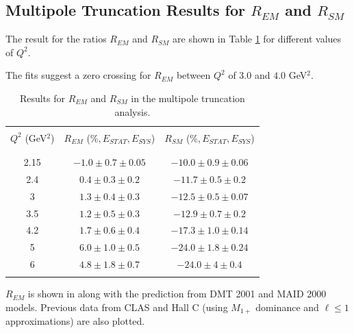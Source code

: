 \cia
\subsection{Multipole Truncation Results for $R_{EM}$ and $R_{SM}$}
The result for the ratios $R_{EM}$ and $R_{SM}$ are shown in Table 
\ref{tab:result_ratio} for different values of $Q^2$.

The fits suggest a zero crossing for $R_{EM}$ between $Q^2$ of $3.0$ and $4.0$ GeV$^2$.

\begin{table}[h]
 \begin{center}
  \begin{tabular}{c | c | c}
          & & \\
    \hline\hline    
        & & \\
    $Q^2$ (GeV$^2$)&     $R_{EM}$ ($\%, E_{STAT},E_{SYS}$)   &    $R_{SM}$ ($\%, E_{STAT},E_{SYS}$) \\ 
    & & \\
    \hline\hline
        & & \\

     
2.15  & $  -1.0 \pm 0.7 \pm 0.05  $  &  $ -10.0  \pm 0.9 \pm 0.06 $ \\
2.4   & $  0.4  \pm 0.3 \pm 0.2   $  &  $ -11.7  \pm 0.5 \pm 0.2  $ \\
3     & $  1.3  \pm 0.4 \pm 0.3   $  &  $ -12.5  \pm 0.5 \pm 0.07 $ \\
3.5   & $  1.2  \pm 0.5 \pm 0.3   $  &  $ -12.9  \pm 0.7 \pm 0.2  $ \\
4.2   & $  1.7  \pm 0.6 \pm 0.4   $  &  $ -17.3  \pm 1.0 \pm 0.14 $ \\
5     & $  6.0  \pm 1.0 \pm 0.5   $  &  $ -24.0  \pm 1.8 \pm 0.24 $ \\
6     & $  4.8  \pm 1.8 \pm 0.7   $  &  $ -24.0  \pm 4   \pm 0.4  $ \\
& & \\
    \hline
  \end{tabular}
 \end{center} 
 \caption{ Results for $R_{EM}$ and $R_{SM}$ in the multipole truncation analysis.}
 \label{tab:result_ratio}
\end{table}

$R_{EM}$ is shown in  along with the prediction from DMT 2001 and MAID 2000 models.
Previous data from CLAS and Hall C (using  $M_{1+}$ dominance and $\ell \le 1$ approximations) 
are also plotted.


